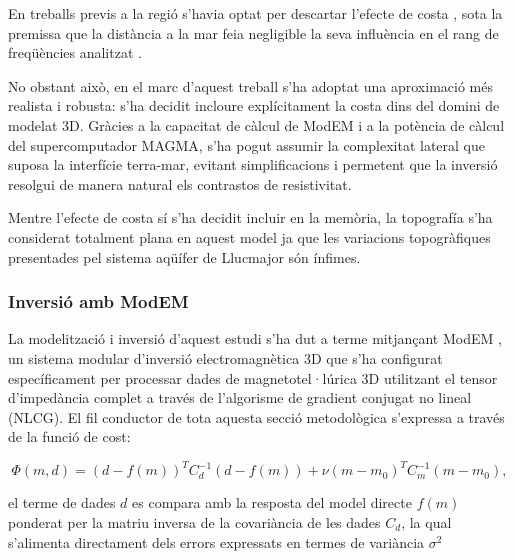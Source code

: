 \documentclass[11pt,a4paper,oneside]{article}
\begin{document}
En treballs previs a la regió s'havia optat per descartar l'efecte de costa \citep{arango2005}, sota la premissa que la distància a la mar feia negligible la seva influència en el rang de freqüències analitzat \citep{pous1995}.

\vspace{5pt}

No obstant això, en el marc d'aquest treball s'ha adoptat una aproximació més realista i robusta: s'ha decidit incloure explícitament la costa dins del domini de modelat 3D. Gràcies a la capacitat de càlcul de ModEM i a la potència de càlcul del supercomputador MAGMA, s'ha pogut assumir la complexitat lateral que suposa la interfície terra-mar, evitant simplificacions i permetent que la inversió resolgui de manera natural els contrastos de resistivitat. 

\vspace{5pt}

Mentre l'efecte de costa sí s'ha decidit incluir en la memòria, la topografía s'ha considerat totalment plana en aquest model ja que les variacions topogràfiques presentades pel sistema aqüífer de Llucmajor són ínfimes. 


\subsubsection{Inversió amb ModEM}

La modelització i inversió d'aquest estudi s'ha dut a terme mitjançant ModEM \citep{egbert2014}, un sistema modular d'inversió electromagnètica 3D que s'ha configurat específicament per processar dades de magnetotel·lúrica 3D utilitzant el tensor d'impedància complet a través de l'algorisme de gradient conjugat no lineal (NLCG). El fil conductor de tota aquesta secció metodològica s'expressa a través de la funció de cost:

\vspace{5pt}

\begin{equation}
    \Phi(m,d) = (d-f(m))^T C_d^{-1} (d-f(m)) + \nu (m-m_0)^T C_m^{-1} (m-m_0),
    \label{eq:16}
\end{equation}


\vspace{5pt}


\noindent
el terme de dades $d$ es compara amb la resposta del model directe $f(m)$ ponderat per la matriu inversa de la covariància de les dades $C_d$, la qual s'alimenta directament dels errors expressats en termes de variància $\sigma^2$
\end{document}
